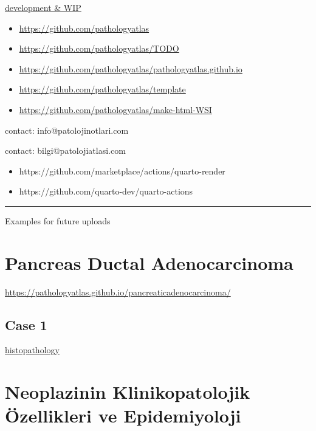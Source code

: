 \documentclass[
  letterpaper,
  DIV=11,
  numbers=noendperiod]{scrreprt}
\begin{document}
\href{https://pathologyatlas.github.io/development.md}{development \&
WIP}

\begin{itemize}
\item
  \url{https://github.com/pathologyatlas}
\item
  \url{https://github.com/pathologyatlas/TODO}
\item
  \url{https://github.com/pathologyatlas/pathologyatlas.github.io}
\item
  \url{https://github.com/pathologyatlas/template}
\item
  \url{https://github.com/pathologyatlas/make-html-WSI}
\end{itemize}

contact: info@patolojinotlari.com

contact: bilgi@patolojiatlasi.com

\begin{itemize}
\item
  https://github.com/marketplace/actions/quarto-render
\item
  https://github.com/quarto-dev/quarto-actions
\end{itemize}

\begin{center}\rule{0.5\linewidth}{0.5pt}\end{center}

Examples for future uploads

\hypertarget{pancreas-ductal-adenocarcinoma}{%
\chapter{Pancreas Ductal
Adenocarcinoma}\label{pancreas-ductal-adenocarcinoma}}

\url{https://pathologyatlas.github.io/pancreaticadenocarcinoma/}

\hypertarget{case-1}{%
\section{Case 1}\label{case-1}}

\href{https://pathologyatlas.github.io/pancreaticadenocarcinoma/case1-histopathology/viewer_z0.html}{histopathology}

\hypertarget{neoplazinin-klinikopatolojik-uxf6zellikleri-ve-epidemiyoloji}{%
\chapter{Neoplazinin Klinikopatolojik Özellikleri ve
Epidemiyoloji}\label{neoplazinin-klinikopatolojik-uxf6zellikleri-ve-epidemiyoloji}}
\end{document}

